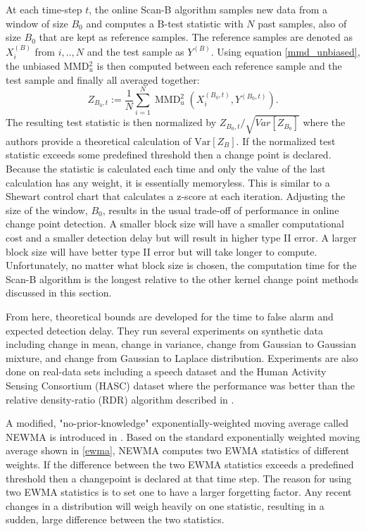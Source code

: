 At each time-step $t$, the online Scan-B algorithm samples new data from a window of size $B_0$ and computes a B-test statistic with $N$ past samples, also of size $B_0$ that are kept as reference samples. The reference samples are denoted as $X_{i}^{(B)}$ from $i,..,N$ and the test sample as $Y^{(B)}$. Using equation \ref{mmd_unbiased}, the unbiased MMD$_u^2$ is then computed between each reference sample and the test sample and finally all averaged together:
\begin{equation}
Z_{B_{0}, t}:=\frac{1}{N} \sum_{i=1}^{N} \operatorname{MMD}_{u}^{2}\left(X_{i}^{\left(B_{0}, t\right)}, Y^{\left(B_{0}, t\right)}\right).
\end{equation}
The resulting test statistic is then normalized by $Z_{B_{0}, t}/\sqrt{Var[Z_{B_0}]}$ where the authors provide a theoretical calculation of $\text{Var}[Z_B]$. If the normalized test statistic exceeds some predefined threshold then a change point is declared. Because the statistic is calculated each time and only the value of the last calculation has any weight,  it is essentially  memoryless. This is similar to a Shewart control chart that calculates a z-score at each iteration. Adjusting the size of the window, $B_0$, results in the usual trade-off of performance in online change point detection. A smaller block size will have a smaller computational cost and a smaller detection delay but will result in higher type II error. A larger block size will have better type II error but will take longer to compute. Unfortunately, no matter what block size is chosen, the computation time for the Scan-B algorithm is the longest relative to the other kernel change point methods discussed in this section. 

From here, theoretical bounds are developed for the time to false alarm and expected detection delay. They run several experiments on synthetic data including change in mean, change in variance, change from Gaussian to Gaussian mixture, and change from Gaussian to Laplace distribution. Experiments are also done on real-data sets including a speech dataset and the Human Activity Sensing Consortium (HASC) dataset where the performance was better than the relative density-ratio (RDR) algorithm described in \cite{liu2013change}.


A modified, "no-prior-knowledge" exponentially-weighted moving average called NEWMA is introduced in \cite{keriven2018newma}. Based on the standard exponentially weighted moving average shown in \ref{ewma}, NEWMA computes two EWMA statistics of different weights. If the difference between the two EWMA statistics exceeds a predefined threshold then a changepoint is declared at that time step. The reason for using two EWMA statistics is to set one to have a larger forgetting factor. Any recent changes in a distribution will weigh heavily on one statistic, resulting in a sudden, large difference between the two statistics. 

